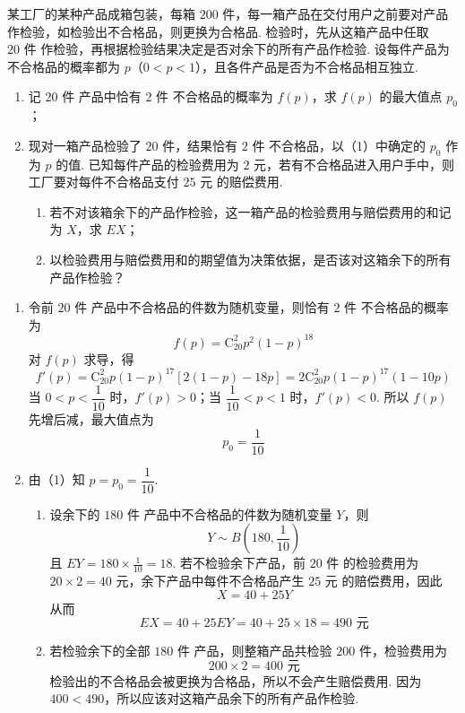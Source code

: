 \begin{problem}
某工厂的某种产品成箱包装，每箱 \(200\text{ 件}\)，每一箱产品在交付用户之前要对产品作检验，如检验出不合格品，则更换为合格品. 检验时，先从这箱产品中任取 \(20\text{ 件}\) 作检验，再根据检验结果决定是否对余下的所有产品作检验. 设每件产品为不合格品的概率都为 \(p\)（\(0<p<1\)），且各件产品是否为不合格品相互独立.

\begin{enumerate}
\item 记 \(20\text{ 件}\) 产品中恰有 \(2\text{ 件}\) 不合格品的概率为 \(f(p)\)，求 \(f(p)\) 的最大值点 \(p_0\)；
\item 现对一箱产品检验了 \(20\text{ 件}\)，结果恰有 \(2\text{ 件}\) 不合格品，以（1）中确定的 \(p_0\) 作为 \(p\) 的值. 已知每件产品的检验费用为 \(2\text{ 元}\)，若有不合格品进入用户手中，则工厂要对每件不合格品支付 \(25\text{ 元}\) 的赔偿费用.
\begin{enumerate}
\item 若不对该箱余下的产品作检验，这一箱产品的检验费用与赔偿费用的和记为 \(X\)，求 \(EX\)；
\item 以检验费用与赔偿费用和的期望值为决策依据，是否该对这箱余下的所有产品作检验？
\end{enumerate}
\end{enumerate}
\end{problem}

\begin{solution}
\begin{enumerate}
\item 令前 \(20\text{ 件}\) 产品中不合格品的件数为随机变量，则恰有 \(2\text{ 件}\) 不合格品的概率为
\[
f(p)=\mathrm C_{20}^{2}p^2(1-p)^{18}
\]
对 \(f(p)\) 求导，得
\[
f'(p)=\mathrm C_{20}^{2}p(1-p)^{17}\left[2(1-p)-18p\right]=2\mathrm C_{20}^{2}p(1-p)^{17}(1-10p)
\]
当 \(0<p<\dfrac1{10}\) 时，\(f'(p)>0\)；当 \(\dfrac1{10}<p<1\) 时，\(f'(p)<0\). 所以 \(f(p)\) 先增后减，最大值点为
\[
p_0=\frac1{10}
\]

\item 由（1）知 \(p=p_0=\dfrac1{10}\).
\begin{enumerate}
\item 设余下的 \(180\text{ 件}\) 产品中不合格品的件数为随机变量 \(Y\)，则
\[
Y\sim B\left(180,\frac1{10}\right)
\]
且 \(EY=180\times\frac1{10}=18\).
若不检验余下产品，前 \(20\text{ 件}\) 的检验费用为 \(20\times2=40\text{ 元}\)，余下产品中每件不合格品产生 \(25\text{ 元}\) 的赔偿费用，因此
\[
X=40+25Y
\]
从而
\[
EX=40+25EY=40+25\times18=490\text{ 元}
\]

\item 若检验余下的全部 \(180\text{ 件}\) 产品，则整箱产品共检验 \(200\text{ 件}\)，检验费用为
\[
200\times2=400\text{ 元}
\]
检验出的不合格品会被更换为合格品，所以不会产生赔偿费用. 因为 \(400<490\)，所以应该对这箱产品余下的所有产品作检验.
\end{enumerate}
\end{enumerate}
\end{solution}

